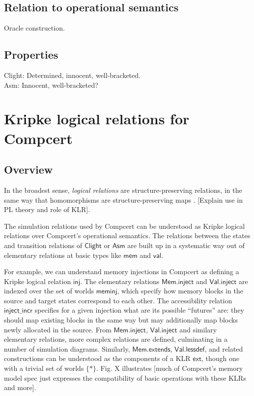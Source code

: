 \documentclass[acmsmall,anonymous,review]{acmart}
\newcommand{\kw}[1]{\ensuremath{ \textsf{#1} }}
\begin{document}

\subsection{Relation to operational semantics} %

Oracle construction.


\subsection{Properties} %

Clight: Determined, innocent, well-bracketed. \\
Asm: Innocent, well-bracketed?



\section{Kripke logical relations for Compcert} %


\subsection{Overview} %

In the broadest sense,
\emph{logical relations} are structure-preserving relations,
in the same way that homomorphisms are structure-preserving maps
\citep{lrp}.
[Explain use in PL theory and role of KLR].

The simulation relations used by Compcert can be understood
as Kripke logical relations over
Compcert's operational semantics.
The relations between
the states and transition relations of \kw{Clight} or \kw{Asm}
are built up in a systematic way out of elementary relations
at basic types like \kw{mem} and \kw{val}.

For example,
we can understand memory injections in Compcert
as defining a Kripke logical relation \kw{inj}.
The elementary relations \kw{Mem.inject} and \kw{Val.inject}
are indexed over the set of worlds \kw{meminj},
which specify how memory blocks in the source and target states
correspond to each other.
The accessibility relation \kw{inject\_incr}
specifies for a given injection
what are its possible ``futures'' are:
they should map existing blocks in the same way
but may additionally map blocks newly allocated in the source.
From \kw{Mem.inject}, \kw{Val.inject} and similary elementary relations,
more complex relations are defined,
culminating in a number of simulation diagrams.
Similarly,
\kw{Mem.extends}, \kw{Val.lessdef}, and related constructions
can be understood as the components of a KLR \kw{ext},
though one with a trivial set of worlds $\{*\}$.
Fig. X illustrates [much of Compcert's memory model spec
just expresses the compatibility of basic operations
with these KLRs and more].
\end{document}
